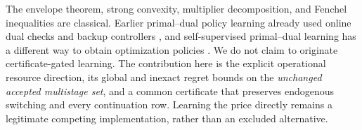 The envelope theorem, strong convexity, multiplier decomposition, and Fenchel inequalities are classical. Earlier primal--dual policy learning already used online dual checks and backup controllers \citep{Zhang2020}, and self-supervised primal--dual learning has a different way to obtain optimization policies \citep{Park2023}. We do not claim to originate certificate-gated learning. The contribution here is the explicit operational resource direction, its global and inexact regret bounds on the \emph{unchanged accepted multistage set}, and a common certificate that preserves endogenous switching and every continuation row. Learning the price directly remains a legitimate competing implementation, rather than an excluded alternative.
